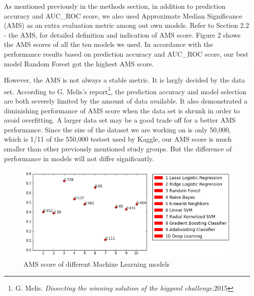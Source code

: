 \documentclass[11pt]{article}
\begin{document}
As mentioned previously in the methods section, in addition to prediction accuracy and AUC\_ROC score, we also used Approximate Median Significance (AMS) as an extra evaluation metric among out own models. Refer to Section 2.2 - the AMS, for detailed definition and indication of AMS score. Figure 2 shows the AMS scores of all the ten models we used. In accordance with the performance results based on prediction accuracy and AUC\_ROC score, our best model Random Forest got the highest AMS score.

However, the AMS is not always a stable metric. It is largly decided by the data set. According to G. Melis's report\footnote{G. Melis. \textit{Dissecting the winning solution of the higgsml challenge}.2015}, the prediction accuracy and model selection are both severely limited by the amount of data available. It also demonstrated a diminishing performance of AMS score when the data set is shrunk in order to avoid overfitting. A larger data set may be a good trade off for a better AMS performance. Since the size of the dataset we are working on is only 50,000, which is 1/11 of the 550,000 testset used by Kaggle, our AMS score is much smaller than other previously mentioned study groups. But the difference of performance in models will not differ significantly.

\begin{figure}[!ht]
    \centering
    \includegraphics[width=6in]{ams.png}
    \caption{AMS score of different Machine Learning models}
\end{figure}

\vspace{50pt}
\end{document}
